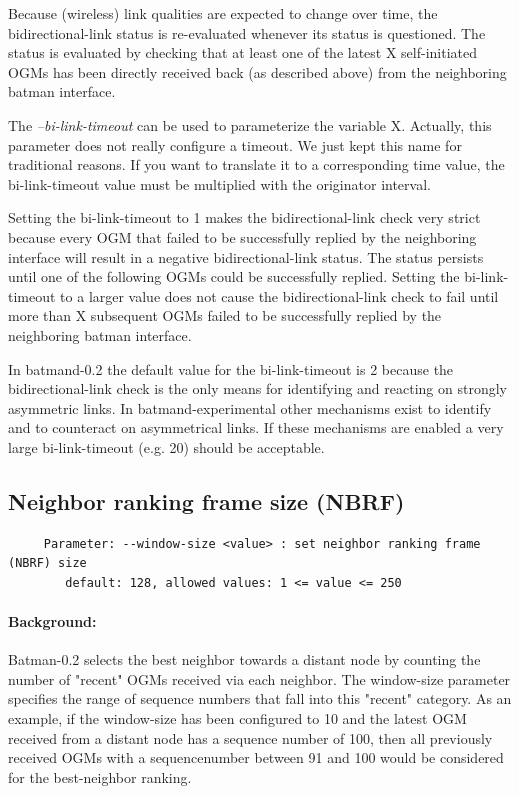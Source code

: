 \documentclass[11pt]{article}
\begin{document}
Because (wireless) link qualities are expected to change over time, the bidirectional-link status is re-evaluated whenever its status is questioned.
%
The status is evaluated by checking that at least one of the latest X self-initiated OGMs has been directly received back (as described above) from the neighboring batman interface.

The  \emph{--bi-link-timeout} can be used to parameterize the variable X.
%
Actually, this parameter does not really configure a timeout. We just kept this name for traditional reasons. If you want to translate it to a corresponding time value, the bi-link-timeout value must be multiplied with the originator interval.

Setting the bi-link-timeout to 1 makes the bidirectional-link check very strict because every OGM that failed to be successfully replied by the neighboring interface will result in a negative bidirectional-link status. The status persists until one of the following OGMs could be successfully replied.
%
Setting the bi-link-timeout to a larger value does not cause the bidirectional-link check to fail until more than X subsequent OGMs failed to be successfully replied by the neighboring batman interface.

In batmand-0.2 the default value for the bi-link-timeout is 2 because the bidirectional-link check is the only means for identifying and reacting on strongly asymmetric links.
%
In batmand-experimental other mechanisms exist to identify and to counteract on asymmetrical links. If these mechanisms are enabled a very large bi-link-timeout (e.g. 20) should be acceptable.



\subsection{Neighbor ranking frame size (NBRF)}

\begin{small}
\begin{verbatim}
     Parameter: --window-size <value> : set neighbor ranking frame (NBRF) size
        default: 128, allowed values: 1 <= value <= 250
\end{verbatim}
\end{small}

\paragraph{Background:} Batman-0.2 selects the best neighbor towards a distant node by counting the number of "recent" OGMs received via each neighbor. The window-size parameter specifies the range of sequence numbers that fall into this "recent" category. As an example, if the window-size has been configured to 10 and the latest OGM received from a distant node has a sequence number of 100, then all previously received OGMs with a sequencenumber between 91 and 100 would be considered for the best-neighbor ranking.
\end{document}
